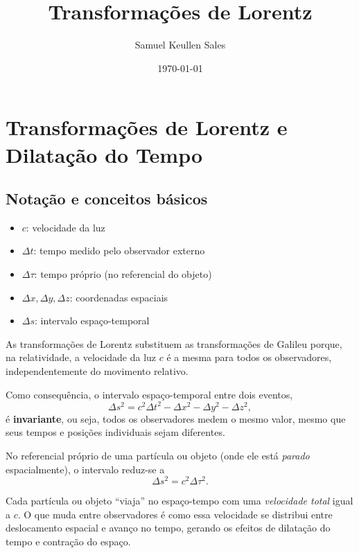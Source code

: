 \documentclass[12pt,a4paper]{article}
\title{Transformações de Lorentz}
\author{Samuel Keullen Sales}
\date{\today}
\begin{document}
\maketitle

\section{Transformações de Lorentz e Dilatação do Tempo}

\subsection{Notação e conceitos básicos}

\begin{itemize}
    \item $c$: velocidade da luz
    \item $\Delta t$: tempo medido pelo observador externo
    \item $\Delta \tau$: tempo próprio (no referencial do objeto)
    \item $\Delta x, \Delta y, \Delta z$: coordenadas espaciais
    \item $\Delta s$: intervalo espaço-temporal
\end{itemize}

As transformações de Lorentz substituem as transformações de Galileu porque, na relatividade, a velocidade da luz $c$ é a mesma para todos os observadores, independentemente do movimento relativo.

Como consequência, o intervalo espaço-temporal entre dois eventos,
\begin{equation}
    \Delta s^2 = c^2 \Delta t^2 - \Delta x^2 - \Delta y^2 - \Delta z^2,
\end{equation}
é \textbf{invariante}, ou seja, todos os observadores medem o mesmo valor, mesmo que seus tempos e posições individuais sejam diferentes.

No referencial próprio de uma partícula ou objeto (onde ele está \emph{parado} espacialmente), o intervalo reduz-se a
\begin{equation}
    \Delta s^2 = c^2 \Delta \tau^2.
\end{equation}

Cada partícula ou objeto “viaja” no espaço-tempo com uma \emph{velocidade total} igual a $c$. O que muda entre observadores é como essa velocidade se distribui entre deslocamento espacial e avanço no tempo, gerando os efeitos de dilatação do tempo e contração do espaço.
\end{document}
